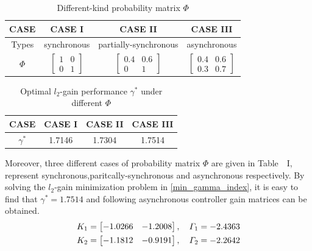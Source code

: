 \documentclass[conference]{IEEEtran}
\begin{document}
\begin{table}[!htbp]
	\centering
	\caption{Different-kind probability matrix $\varPhi$}  
	\begin{tabular}{c|c|c|c}
		\hline 
		CASE& CASE I & CASE II & CASE III \\ \hline
		Types&synchronous &partially-synchronous &asynchronous\\ \hline
		$\varPhi$
		&
		$
		\begin{bmatrix}
		1&0\\
		0&1
		\end{bmatrix}$ 
		&
		$
		\begin{bmatrix}
		0.4&0.6\\
		0&1
		\end{bmatrix}$  
		&
		$
		\begin{bmatrix}
		0.4&0.6\\
		0.3&0.7
		\end{bmatrix}$   
		\\ \hline
		
	\end{tabular}
\end{table}
\begin{table}[!htbp]
	\centering
	\caption{Optimal $l_2$-gain performance $\gamma^{*}$ under different $\varPhi$ } 
	\begin{tabular}{c|c|c|c}
		\hline 
		CASE& CASE I & CASE II & CASE III \\ \hline
		$\gamma^{*}$& 1.7146&1.7304& 1.7514\\ \hline
	\end{tabular}
\end{table} 
Moreover, three different cases of probability matrix $\varPhi$ are given in Table　I, represent synchronous,paritcally-synchronous and asynchronous respectively. 
By solving the $l_2$-gain minimization problem in \eqref{min_gamma_index}, it is easy to find that $\gamma^{*}=1.7514$ and following asynchronous controller gain matrices can be obtained.
\begin{equation}\notag
	\begin{aligned}
		K_{1}=\begin{bmatrix}
			-1.0266&-1.2008
		\end{bmatrix},\quad
		\varGamma_{1}=-2.4363 \\
		K_{2}=\begin{bmatrix}
		-1.1812&-0.9191
		\end{bmatrix},\quad
		\varGamma_{2}=-2.2642
	\end{aligned}
\end{equation}
\end{document}
